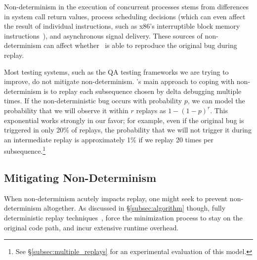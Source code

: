 Non-determinism in the execution of concurrent processes stems from
differences in system call return values, process scheduling decisions (which can
even affect the result of individual instructions, such as x86's
interruptible block memory instructions~\cite{Dunlap:2002:REI:844128.844148}),
and asynchronous signal
delivery. These sources of non-determinism can affect whether \projectname~is
able to reproduce the original bug during replay.

Most testing systems, such as the QA testing frameworks we are
trying to improve, do not mitigate non-determinism.
\projectname's main approach to coping with non-determinism
is to replay each subsequence chosen
by delta debugging multiple times. If the non-deterministic bug occurs with
probability $p$, we can model the probability that we will observe it within $r$ replays as $1-(1-p)^{r}$. This exponential
works strongly in our favor; for example, even if the original bug is
triggered in only 20\% of replays, the probability that we will not trigger
it during an intermediate replay is approximately
1\% if we replay 20 times per subsequence.\footnote{See
\S\ref{subsec:multiple_replays} for an experimental evaluation of this model.}

\subsection{Mitigating Non-Determinism}
\label{subsec:mitigating}

When non-determinism acutely impacts replay, one might seek to prevent non-determinism altogether.
As discussed in \S\ref{subsec:algorithm} though, fully deterministic replay techniques~\cite{Dunlap:2002:REI:844128.844148,Geels:2006:RDD:1267359.1267386},
force the minimization process to stay on the original code path, and incur
extensive runtime overhead.


